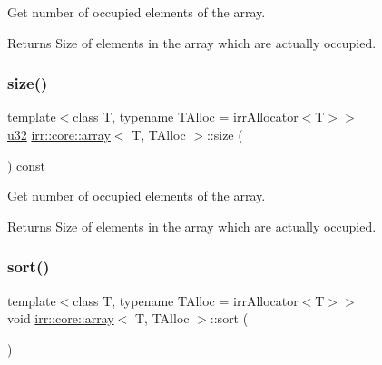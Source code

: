 Get number of occupied elements of the array. 

\begin{DoxyReturn}{Returns}
Size of elements in the array which are actually occupied. 
\end{DoxyReturn}
\mbox{\label{classirr_1_1core_1_1array_ab10777d1bb278c29e159ec59b5dc9378}} 
\subsubsection{\texorpdfstring{size()}{size()}\hspace{0.1cm}{\footnotesize\ttfamily [2/2]}}
{\footnotesize\ttfamily template$<$class T, typename T\+Alloc = irr\+Allocator$<$\+T$>$$>$ \\
\hyperlink{namespaceirr_a0416a53257075833e7002efd0a18e804}{u32} \hyperlink{classirr_1_1core_1_1array}{irr\+::core\+::array}$<$ T, T\+Alloc $>$\+::size (\begin{DoxyParamCaption}{ }\end{DoxyParamCaption}) const\hspace{0.3cm}{\ttfamily [inline]}}



Get number of occupied elements of the array. 

\begin{DoxyReturn}{Returns}
Size of elements in the array which are actually occupied. 
\end{DoxyReturn}
\mbox{\label{classirr_1_1core_1_1array_a870e52dd57dd67a9d59e5ca5f82bca94}} 
\subsubsection{\texorpdfstring{sort()}{sort()}\hspace{0.1cm}{\footnotesize\ttfamily [1/2]}}
{\footnotesize\ttfamily template$<$class T, typename T\+Alloc = irr\+Allocator$<$\+T$>$$>$ \\
void \hyperlink{classirr_1_1core_1_1array}{irr\+::core\+::array}$<$ T, T\+Alloc $>$\+::sort (\begin{DoxyParamCaption}{ }\end{DoxyParamCaption})\hspace{0.3cm}{\ttfamily [inline]}}



